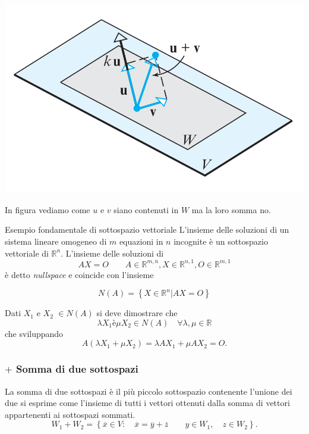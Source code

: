 \documentclass[x11names]{article}
\begin{document}
\begin{center}
\includegraphics[scale=0.25]{figures/subspace.png}
\end{center}
In figura vediamo come $u$ e $v$ siano contenuti in $W$ ma la loro somma no.

\begin{es}{Esempio fondamentale di sottospazio vettoriale}
L'insieme delle soluzioni di un sistema lineare omogeneo di $m$ equazioni in $n$ incognite è un sottospazio vettoriale di $\mathbb{R}^n$. L'insieme delle soluzioni di 
\[
AX = O \qquad A \in \mathbb{R}^{m,n}, X \in \mathbb{R}^{n,1}, O \in \mathbb{R}^{m,1}
\] 
è detto \textit{nullspace} e coincide con l'insieme

\[
N\left(A\right) = \left\{ X \in \mathbb{R}^n | AX = O  \right\}
\]

Dati $X_1$ e $X_2$ $\in N\left(A\right)$ si deve dimostrare che 
\[
\lambda X_1 è \mu X_2 \in N\left(A\right) \quad \forall \lambda,\mu \in \mathbb{R}
\] 
che sviluppando
\[
A\left(\lambda X_1 + \mu X_2\right) = \lambda AX_1 + \mu AX_2 = O
.\] 
\end{es}


\subsubsection{$+$ Somma di due sottospazi}
La somma di due sottospazi è il più piccolo sottospazio contenente l'unione dei due si esprime come l'insieme di tutti i vettori ottenuti dalla somma di vettori appartenenti ai sottospazi sommati.
\[
W_1 + W_2  = \left\{\overline{x} \in V: \quad \overline{x} = \overline{y}+\overline{z}  \qquad y \in W_1, \quad z \in W_2\right\}
.\] 
\end{document}
